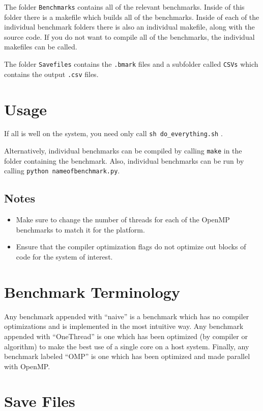 \documentclass [letterpaper, 10pt, notitlepage, fleqn, oneside, 
  landscape] {article}
\begin{document}
\begin{multicols}{2}
The folder \texttt{Benchmarks} contains all of the relevant benchmarks. 
Inside of this folder there is a makefile which builds all of the benchmarks.
Inside of each of the individual benchmark folders there is also an 
individual makefile, along with the source code. If you do not want to compile 
all of the benchmarks, the individual makefiles can be called.

The folder \texttt{Savefiles} contains the \texttt{.bmark} files and a 
subfolder called \texttt{CSVs} which contains the output \texttt{.csv} 
files.

\section{Usage}

If all is well on the system, you need only call \texttt{sh do\_everything.sh} .

Alternatively, individual benchmarks can be compiled 
by calling \texttt{make} in the folder containing the benchmark. Also, 
individual benchmarks can be run by calling \texttt{python nameofbenchmark.py}.

\subsection{Notes}

\begin{itemize}[leftmargin=0.6cm]
  \item Make sure to change the number of threads for each of the OpenMP 
    benchmarks to match it for the platform.
  \item Ensure that the compiler optimization flags do not optimize out 
    blocks of code for the system of interest. 
\end{itemize}

\section{Benchmark Terminology}

Any benchmark appended with ``naive'' is a benchmark which has no compiler 
optimizations and is implemented in the most intuitive way. Any benchmark 
appended with ``OneThread'' is one which has been optimized (by compiler or 
algorithm) to make the best use of a single core on a host system. Finally, 
any benchmark labeled ``OMP'' is one which has been optimized and made parallel 
with OpenMP. 

\section{Save Files}


\end{multicols}
\end{document}
